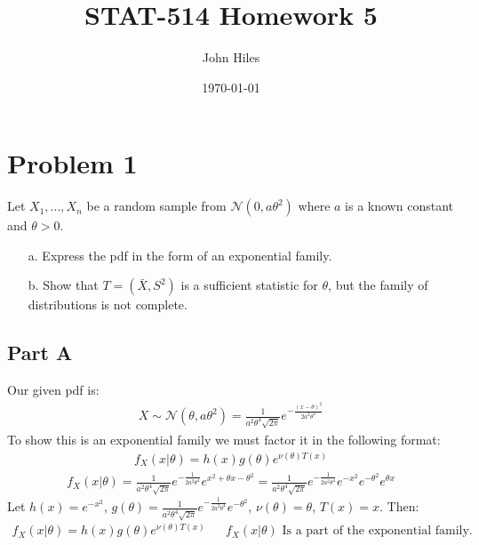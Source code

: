 \documentclass{article}
\title{STAT-514 Homework 5}
\author{John Hiles}
\date\today
\begin{document}
\maketitle %

\section*{Problem 1}
Let $X_1,...,X_n$ be a random sample from $\mathcal{N}(0,a\theta^2)$ where $a$ is a known constant and $\theta > 0$.
\begin{enumerate}
\item[a.] Express the pdf in the form of an exponential family.
\item[b.] Show that $T=(\bar{X}, S^2)$ is a sufficient statistic for $\theta$, but the family of distributions is not complete.
\end{enumerate}
\subsection*{Part A}
Our given pdf is:
\begin{align*}
X \sim \mathcal{N}(\theta, a \theta^2) = \frac{1}{a^2 \theta^4 \sqrt{2\pi}} e^{-\frac{(x-\theta)^2}{2 a^2 \theta^4}}
\end{align*}
To show this is an exponential family we must factor it in the following format:
\begin{align*}
f_X(x|\theta) = h(x) g(\theta) e^{\nu(\theta) T(x)}
\end{align*}
\begin{align*}
f_X(x|\theta) = \frac{1}{a^2 \theta^4 \sqrt{2\pi}} e^{-\frac{1}{2 a^2 \theta^4}} e^{x^2+\theta x - \theta^2} = \frac{1}{a^2 \theta^4 \sqrt{2\pi}} e^{-\frac{1}{2 a^2 \theta^4}} e^{-x^2} e^{-\theta^2} e^{\theta x}
\end{align*}
Let $h(x)=e^{-x^2}$, $g(\theta)=\frac{1}{a^2 \theta^4 \sqrt{2\pi}}e^{-\frac{1}{2 a^2 \theta^4}} e^{-\theta^2}$, $\nu(\theta)=\theta$, $T(x)=x$. Then:
\begin{align*}
f_X(x|\theta) = h(x) g(\theta) e^{\nu(\theta) T(x)} && \boxed{f_X(x|\theta) \text{ Is a part of the exponential family.}}
\end{align*}
\end{document}
